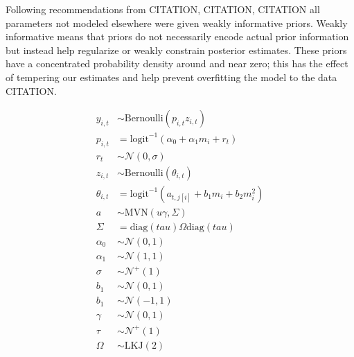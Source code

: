\documentclass[12pt,letterpaper]{article}
\begin{document}
Following recommendations from CITATION, CITATION, CITATION all parameters not modeled elsewhere were given weakly informative priors. Weakly informative means that priors do not necessarily encode actual prior information but instead help regularize or weakly constrain posterior estimates. These priors have a concentrated probability density around and near zero; this has the effect of tempering our estimates and help prevent overfitting the model to the data CITATION. 

\begin{equation}
  \begin{aligned}
    y_{i, t} &\sim \text{Bernoulli}(p_{i, t} z_{i, t}) \\
    p_{i, t} &= \text{logit}^{-1}(\alpha_{0} + \alpha_{1} m_{i} + r_{t}) \\ 
    r_{t} &\sim \mathcal{N}(0, \sigma) \\
    z_{i, t} &\sim \text{Bernoulli}(\theta_{i, t}) \\
    \theta_{i, t} &= \text{logit}^{-1}(a_{t, j[i]} + b_{1} m_{i} + b_{2} m_{i}^{2}) \\
    a &\sim \text{MVN}(u \gamma, \Sigma) \\
    \Sigma &= \text{diag}(tau) \Omega \text{diag}(tau) \\
    \alpha_{0} &\sim \mathcal{N}(0, 1) \\
    \alpha_{1} &\sim \mathcal{N}(1, 1) \\
    \sigma &\sim \mathcal{N}^{+}(1) \\
    b_{1} &\sim \mathcal{N}(0, 1) \\
    b_{1} &\sim \mathcal{N}(-1, 1) \\
    \gamma &\sim \mathcal{N}(0, 1) \\
    \tau &\sim \mathcal{N}^{+}(1) \\
    \Omega &\sim \text{LKJ}(2) \\
  \end{aligned}
  \label{eq:full}
\end{equation}
\end{document}
